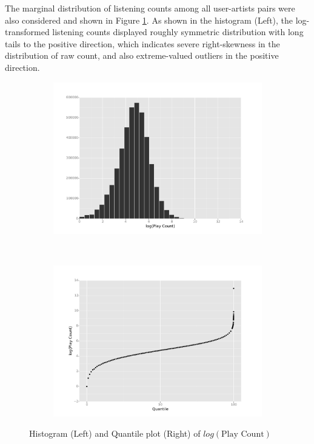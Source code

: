 \documentclass[11pt]{article}
\theoremstyle{definition}
\begin{document}
The marginal distribution of listening counts among all user-artists pairs were also considered and shown in Figure \ref{fig:count}. As shown in the histogram (Left), the log-transformed listening counts displayed roughly symmetric distribution with long tails to the positive direction, which indicates severe right-skewness in the distribution of raw count, and also extreme-valued outliers in the positive direction. 

\begin{figure}[!h]
        \centering
        \begin{subfigure}[b]{0.3\textwidth}
                \includegraphics[width=\textwidth]{"./plots/hist_freq_log"}
        \end{subfigure}%
        ~
        \begin{subfigure}[b]{0.3\textwidth}
                \includegraphics[width=\textwidth]{"./plots/hist_freq_qq"}
        \end{subfigure}
        \caption{Histogram (Left) and Quantile plot (Right) of $log(\mbox{Play Count})$}
        \label{fig:count}
\end{figure}
\end{document}
